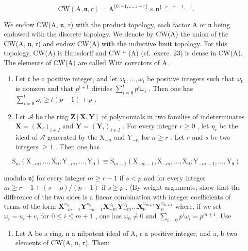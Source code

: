\[
\mathrm{CW} (\mathrm{A}, \mathfrak {n}, r) = \mathrm{A} ^ {\{0, - 1, \dots , 1 - r \}} \times \mathfrak {n} ^ {\{- r, - r - 1, \dots \}}.
\]

We endow CW(A, \(\mathfrak{n}\), r) with the product topology, each factor A or \(\mathfrak{n}\) being endowed with the discrete topology. We denote by CW(A) the union of the CW(A, \(\mathfrak{n}\), r) and endow CW(A) with the inductive limit topology. For this topology, CW(A) is Hausdorff and CW \(^{u}\) (A) (cf.~exerc. 23) is dense in CW(A). The elements of CW(A) are called Witt covectors of A.

\begin{enumerate}
\def\labelenumi{\alph{enumi})}
\item
  Let \(t\) be a positive integer, and let \(\omega_0, \ldots, \omega_t\) be positive integers such that \(\omega_0\) is nonzero and that \(p^{t+1}\) divides \(\sum_{i=0}^{t} p^i \omega_i\) . Then one has \(\sum_{i=0}^{t} \omega_i \geqslant t(p-1) + p\) .
\item
  Let \(\mathcal{A}\) be the ring \(\mathbf{Z}[\mathbf{X},\mathbf{Y}]\) of polynomials in two families of indeterminates \(\mathbf{X} = (\mathbf{X}_i)_{i\in I}\) and \(\mathbf{Y} = (\mathbf{Y}_i)_{i\in I}\) . For every integer \(r\geqslant 0\) , let \(\eta_r\) be the ideal of \(\mathcal{A}\) generated by the \(\mathrm{X}_{-n}\) and \(\mathrm{Y}_{-n}\) for \(n\geqslant r\) . Let \(r\) and \(s\) be two integers \(\geqslant 1\) . Then one has
\end{enumerate}

\[
\mathrm{S} _ {m} \left(\mathrm{X} _ {- m}, \dots , \mathrm{X} _ {0}; \mathrm{Y} _ {- m}, \dots , \mathrm{Y} _ {0}\right) \equiv \mathrm{S} _ {m + 1} \left(\mathrm{X} _ {- m - 1}, \mathrm{X} _ {- m}, \dots , \mathrm{X} _ {0}; \mathrm{Y} _ {- m - 1}, \dots , \mathrm{Y} _ {0}\right)
\]

modulo \(\mathfrak{n}_r^s\) for every integer \(m \geqslant r - 1\) if \(s < p\) and for every integer \(m \geqslant r - 1 + (s - p) / (p - 1)\) if \(s \geqslant p\) . (By weight arguments, show that the difference of the two sides is a linear combination with integer coefficients of terms of the form \(\mathbf{X}_{-m-1}^{u_0}\mathbf{Y}_{-m-1}^{v_0}\mathbf{X}_{-m}^{u_1}\mathbf{Y}_{-m}^{v_1}\ldots\mathbf{X}_0^{u_{m+1}}\mathbf{Y}_0^{v_{m+1}}\) where, if we set \(\omega_i = u_i + v_i\) for \(0 \leqslant i \leqslant m + 1\) , one has \(\omega_0 \neq 0\) and \(\sum_{i=0} p^i \omega_i = p^{m+1}\). Use

\begin{enumerate}
\def\labelenumi{\alph{enumi})}
\setcounter{enumi}{2}
\tightlist
\item
  Let A be a ring, n a nilpotent ideal of A, r a positive integer, and a, b two elements of CW(A, n, r). Then:
\end{enumerate}

